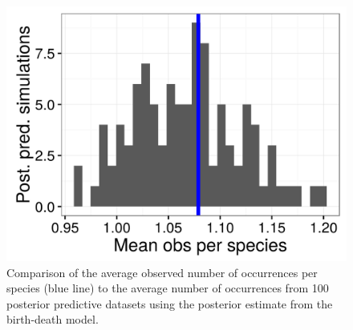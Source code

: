 \documentclass[12pt,letterpaper]{article}
\begin{document}
\begin{figure}[ht]
  \centering
  \includegraphics[width=\textwidth,height=0.4\textheight,keepaspectratio=true]{figure/pred_occ_bd}
  \caption[Posterior predictive check for birth-death model]{Comparison of the average observed number of occurrences per species (blue line) to the average number of occurrences from 100 posterior predictive datasets using the posterior estimate from the birth-death model.}
  \label{fig:ppc_birth_death}
\end{figure}


\end{document}
